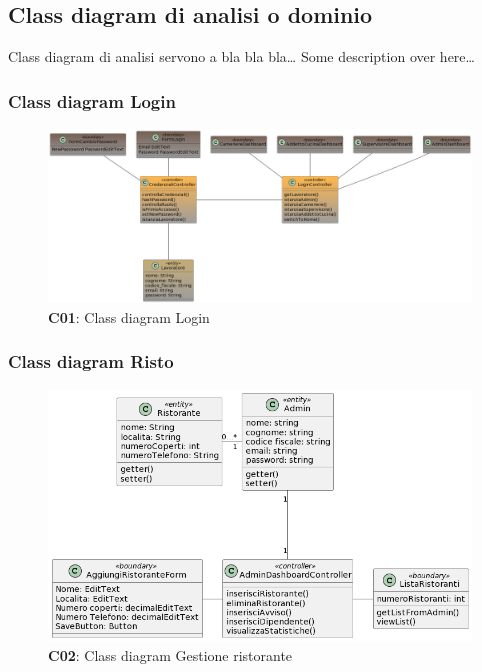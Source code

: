 \subsection{Class diagram di analisi o dominio}

    \begin{flushleft}
        Class diagram di analisi servono a bla bla bla\ldots
        Some description over here\ldots
    \end{flushleft}

    \subsubsection{Class diagram Login}
        \begin{figure}[H]
            \centering
            \includegraphics[scale=0.2]{assets/diagrammi/Class diagram di analisi/Login_3.png}
            \caption{\textbf{C01}: Class diagram Login}\label{fig:Login}
        \end{figure}

    \subsubsection{Class diagram Risto}
        \begin{figure}[H]
            \centering
            \includegraphics[scale=0.5]{assets/diagrammi/Class diagram di analisi/Gestione ristorante.png}
            \caption{\textbf{C02}: Class diagram Gestione ristorante}\label{fig:Ristorante}
        \end{figure}

